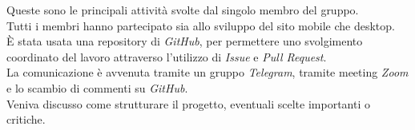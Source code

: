 Queste sono le principali attività svolte dal singolo membro del gruppo.\\
Tutti i membri hanno partecipato sia allo sviluppo del sito mobile che desktop.\\
È stata usata una repository di \emph{GitHub}, per permettere uno svolgimento coordinato del lavoro attraverso l'utilizzo di \emph{Issue} e \emph{Pull Request}.\\ %
La comunicazione è avvenuta tramite un gruppo \emph{Telegram}, tramite meeting \emph{Zoom} e lo scambio di commenti su \emph{GitHub}.\\
Veniva discusso come strutturare il progetto, eventuali scelte importanti o critiche. %